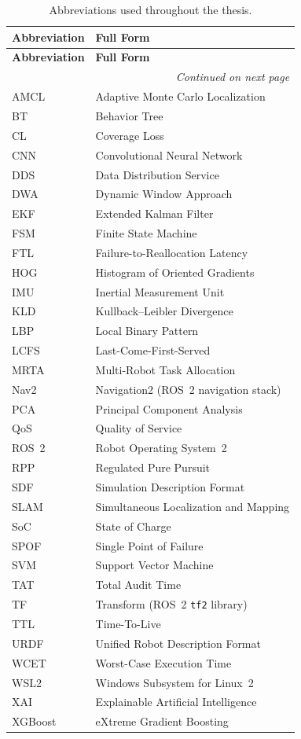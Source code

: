 \begin{longtable}{@{}p{}p{}@{}}
\caption{Abbreviations used throughout the thesis.}
\label{tab:notation_abbreviations} \\
\toprule
\textbf{Abbreviation} & \textbf{Full Form} \\
\midrule
\endfirsthead
\toprule
\textbf{Abbreviation} & \textbf{Full Form} \\
\midrule
\endhead
\midrule
\multicolumn{2}{r}{\textit{Continued on next page}} \\
\endfoot
\bottomrule
\endlastfoot

AMCL & Adaptive Monte Carlo Localization \\
BT & Behavior Tree \\
CL & Coverage Loss \\
CNN & Convolutional Neural Network \\
DDS & Data Distribution Service \\
DWA & Dynamic Window Approach \\
EKF & Extended Kalman Filter \\
FSM & Finite State Machine \\
FTL & Failure-to-Reallocation Latency \\
HOG & Histogram of Oriented Gradients \\
IMU & Inertial Measurement Unit \\
KLD & Kullback--Leibler Divergence \\
LBP & Local Binary Pattern \\
LCFS & Last-Come-First-Served \\
MRTA & Multi-Robot Task Allocation \\
Nav2 & Navigation2 (ROS~2 navigation stack) \\
PCA & Principal Component Analysis \\
QoS & Quality of Service \\
ROS~2 & Robot Operating System~2 \\
RPP & Regulated Pure Pursuit \\
SDF & Simulation Description Format \\
SLAM & Simultaneous Localization and Mapping \\
SoC & State of Charge \\
SPOF & Single Point of Failure \\
SVM & Support Vector Machine \\
TAT & Total Audit Time \\
TF & Transform (ROS~2 \texttt{tf2} library) \\
TTL & Time-To-Live \\
URDF & Unified Robot Description Format \\
WCET & Worst-Case Execution Time \\
WSL2 & Windows Subsystem for Linux~2 \\
XAI & Explainable Artificial Intelligence \\
XGBoost & eXtreme Gradient Boosting \\

\end{longtable}